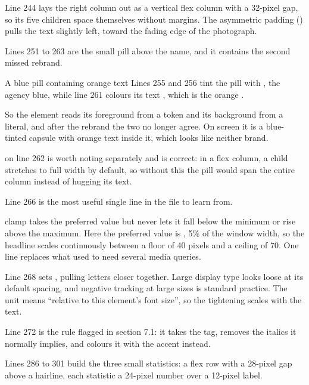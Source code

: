 Line 244 lays the right column out as a vertical flex column with a 32-pixel gap,
so its five children space themselves without margins. The asymmetric padding
() pulls the text slightly left, toward the fading edge of the
photograph.

Lines 251 to 263 are the small pill above the name, and it contains the second
missed rebrand.

\begin{honest}{A blue pill containing orange text}
Lines 255 and 256 tint the pill with , the agency blue,
while line 261 colours its text , which is the orange
.

So the element reads its foreground from a token and its background from a
literal, and after the rebrand the two no longer agree. On screen it is a
blue-tinted capsule with orange text inside it, which looks like neither brand.

 on line 262 is worth noting separately and is correct: in
a flex column, a child stretches to full width by default, so without this the pill
would span the entire column instead of hugging its text.
\end{honest}

Line 266 is the most useful single line in the file to learn from.

\begin{jargon}{clamp}
 takes the preferred value but never lets
it fall below the minimum or rise above the maximum. Here the preferred value is
, 5\% of the window width, so the headline scales continuously between a
floor of 40 pixels and a ceiling of 70. One line replaces what used to need several
media queries.
\end{jargon}

Line 268 sets , pulling letters closer together. Large
display type looks loose at its default spacing, and negative tracking at large
sizes is standard practice. The unit  means ``relative to this element's
font size'', so the tightening scales with the text.

Line 272 is the rule flagged in section 7.1: it takes the  tag, removes
the italics it normally implies, and colours it with the accent instead.

Lines 286 to 301 build the three small statistics: a flex row with a 28-pixel gap
above a hairline, each statistic a 24-pixel number over a 12-pixel label.

